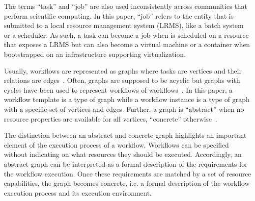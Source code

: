 The terms ``task'' and ``job'' are also used inconsistently across communities
that perform scientific computing. In this paper, ``job'' refers to the entity
that is submitted to a local resource management system (LRMS), like a batch
system or a scheduler. As such, a task can become a job when is scheduled on a
resource that exposes a LRMS but can also become a virtual machine or a
container when bootstrapped on an infrastructure supporting virtualization.

Usually, workflows are represented as graphs where tasks are vertices and
their relations are edges~\cite{}. Often, graphs are supposed to be acyclic
but graphs with cycles have been used to represent workflows of
workflows~\cite{}. In this paper, a workflow template is a type of graph while
a workflow instance is a type of graph with a specific set of vertices and
edges. Further, a graph is ``abstract'' when no resource properties are
available for all vertices, ``concrete'' otherwise~\cite{}.

The distinction between an abstract and concrete graph highlights an important
element of the execution process of a workflow. Workflows can be specified
without indicating on what resources they should be executed. Accordingly, an
abstract graph can be interpreted as a formal description of the requirements
for the workflow execution. Once these requirements are matched by a set of
resource capabilities, the graph becomes concrete, i.e. a formal description
of the workflow execution process and its execution environment.

